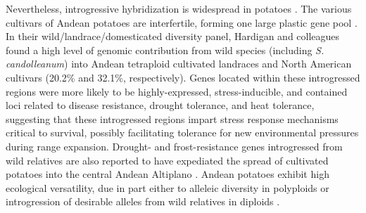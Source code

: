 \documentclass[11pt]{article}
\begin{document}
\begin{enumerate}
Nevertheless, introgressive hybridization is widespread in potatoes \cite{grun1990evolution}.
The various cultivars of Andean potatoes are interfertile, forming one large plastic gene pool \cite{quiros1992increase}.
In their wild/landrace/domesticated diversity panel, Hardigan and colleagues \cite{hardigan2017genome} found a high level of genomic contribution from wild species (including \emph{S. candolleanum}) into Andean tetraploid cultivated landraces and North American cultivars (20.2\% and 32.1\%, respectively).
Genes located within these introgressed regions were more likely to be highly-expressed, stress-inducible, and contained loci related to disease resistance, drought tolerance, and heat tolerance, suggesting that these introgressed regions impart stress response mechanisms critical to survival, possibly facilitating tolerance for new environmental pressures during range expansion.
Drought- and frost-resistance genes introgressed from wild relatives are also reported to have expediated the spread of cultivated potatoes into the central Andean Altiplano \cite{johns1986ongoing, hawkes1962origin, schmiediche1980breeding}.
Andean potatoes exhibit high ecological versatility, due in part either to alleleic diversity in polyploids or introgression of desirable alleles from wild relatives in diploids \cite{zimmerer1998ecogeography}.














\end{enumerate}

	

	
	
	
	
	
	
\end{document}
